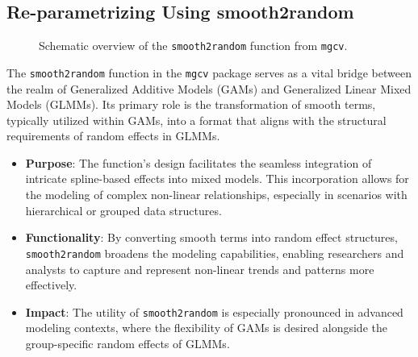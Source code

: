 \documentclass[12pt, twoside,hidelinks]{article}
\theoremstyle{definition}
\numberwithin{equation}{section}
\begin{document}
\subsection{Re-parametrizing Using smooth2random}

\begin{figure}[h]
\centering
{}
\caption{Schematic overview of the \texttt{smooth2random} function from \texttt{mgcv}.}
\end{figure}

The \texttt{smooth2random} function in the \texttt{mgcv} package serves as a vital bridge between the realm of Generalized Additive Models (GAMs) and Generalized Linear Mixed Models (GLMMs). Its primary role is the transformation of smooth terms, typically utilized within GAMs, into a format that aligns with the structural requirements of random effects in GLMMs.

\begin{itemize}
    \item \textbf{Purpose}: The function's design facilitates the seamless integration of intricate spline-based effects into mixed models. This incorporation allows for the modeling of complex non-linear relationships, especially in scenarios with hierarchical or grouped data structures.
    
    \item \textbf{Functionality}: By converting smooth terms into random effect structures, \texttt{smooth2random} broadens the modeling capabilities, enabling researchers and analysts to capture and represent non-linear trends and patterns more effectively.
    
    \item \textbf{Impact}: The utility of \texttt{smooth2random} is especially pronounced in advanced modeling contexts, where the flexibility of GAMs is desired alongside the group-specific random effects of GLMMs.
\end{itemize}
\end{document}
